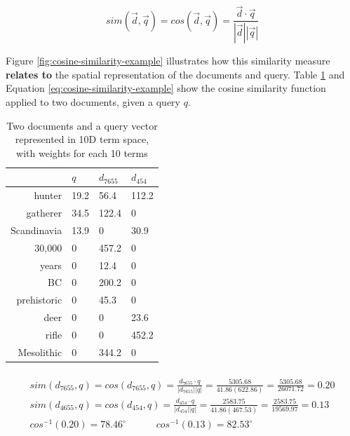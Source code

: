 \documentclass{article}
\begin{document}
\begin{equation}
	sim(\vec{d}, \vec{q}) = cos(\vec{d}, \vec{q}) = \frac{\vec{d} \cdot \vec{q}}{|\vec{d}| |\vec{q}|}
	\label{eq:cosine-similarity}
\end{equation}

Figure \ref{fig:cosine-similarity-example} illustrates how this similarity measure \textbf{relates to} the spatial representation of the documents and query. Table \ref{tab:cosine-similarity-example} and Equation \ref{eq:cosine-similarity-example} show the cosine similarity function applied to two documents, given a query $q$.

\begin{table}[H]
	\centering
	\begin{tabular}{|r|l|l|l|}
		\hline
		& $q$ & $d_{7655}$ & $d_{454}$ \\
		\hline
		hunter & 19.2 & 56.4 & 112.2 \\
		gatherer & 34.5 & 122.4 & 0 \\
		Scandinavia & 13.9 & 0 & 30.9 \\
		30,000 & 0 & 457.2 & 0 \\
		years & 0 & 12.4 & 0 \\
		BC & 0 & 200.2 & 0 \\
		prehistoric & 0 & 45.3 & 0 \\
		deer & 0 & 0 & 23.6 \\
		rifle & 0 & 0 & 452.2 \\
		Mesolithic & 0 & 344.2 & 0 \\
		\hline
	\end{tabular}
	\caption{Two documents and a query vector represented in 10D term space, with weights for each 10 terms}
	\label{tab:cosine-similarity-example}
\end{table}

\begin{multline}\\
	sim(d_{7655}, q) = cos(d_{7655}, q) = \frac{d_{7655} \cdot q}{|d_{7655}| |q|} = \frac{5305.68}{41.86(622.86)} = \frac{5305.68}{26071.72} = 0.20 \\
	sim(d_{4655}, q) = cos(d_{454}, q) = \frac{d_{454} \cdot q}{|d_{454}| |q|} = \frac{2583.75}{41.86(467.53)} = \frac{2583.75}{19569.97} = 0.13 \\
	cos^{-1}(0.20) = 78.46^{\circ}
	\;\;\;\;\;\;\;\;\;\;\;
	cos^{-1}(0.13) = 82.53^{\circ} \\
	\label{eq:cosine-similarity-example}
\end{multline}
\end{document}
